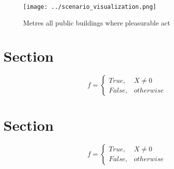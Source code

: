 \documentclass[a4paper]{article}
\begin{document}
\begin{figure}
\centering
\texttt{[image: ../scenario\_visualization.png]}
\caption{Metres all public buildings where pleasurable act
}
\end{figure}
 
\section{Section}

\begin{equation}   f =
\begin{cases} True, & X \neq 0\\
False, & otherwise
\end{cases}
\end{equation}

\section{Section}

\begin{equation}   f =
\begin{cases} True, & X \neq 0\\
False, & otherwise
\end{cases}
\end{equation}
\end{document}

